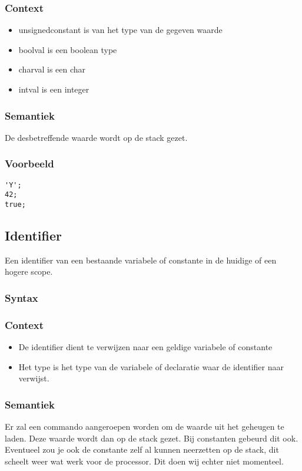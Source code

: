 \documentclass[]{article}
\begin{document}
\subsubsection{Context}
\begin{itemize}
\item unsignedconstant is van het type van de gegeven waarde
\item boolval is een boolean type
\item charval is een char
\item intval is een integer
\end{itemize}
\subsubsection{Semantiek}
De desbetreffende waarde wordt op de stack gezet.
\subsubsection{Voorbeeld}
\begin{lstlisting}[style=SELMA]
'Y';
42;
true;
\end{lstlisting}

\subsection{Identifier}
Een identifier van een bestaande variabele of constante in de huidige of een hogere scope.
\subsubsection{Syntax}

\subsubsection{Context}
\begin{itemize}
\item De identifier dient te verwijzen naar een geldige variabele of constante
\item Het type is het type van de variabele of declaratie waar de identifier naar verwijst.
\end{itemize}
\subsubsection{Semantiek}
Er zal een commando aangeroepen worden om de waarde uit het geheugen te laden. Deze waarde wordt dan op de stack gezet. Bij constanten gebeurd dit ook. Eventueel zou je ook de constante zelf al kunnen neerzetten op de stack, dit scheelt weer wat werk voor de processor. Dit doen wij echter niet momenteel.
\end{document}
